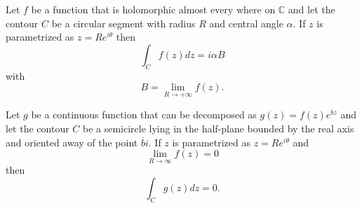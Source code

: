     \begin{theorem}\label{complexcalculus:theorem:great_limit}
        Let $f$ be a function that is holomorphic almost every where on $\mathbb{C}$ and let the contour $C$ be a circular segment with radius $R$ and central angle $\alpha$. If $z$ is parametrized as $z = Re^{i\theta}$ then\[\int_Cf(z)dz = i\alpha B\] with \[B = \lim_{R\rightarrow+\infty}f(z).\]
    \end{theorem}

    \begin{theorem}\label{complexcalculus:theorem:jordan}
        Let $g$ be a continuous function that can be decomposed as $g(z) = f(z)e^{bz}$ and let the contour $C$ be a semicircle lying in the half-plane bounded by the real axis and oriented away of the point $\overline{b}i$. If $z$ is parametrized as $z=Re^{i\theta}$ and \[\lim_{R\rightarrow\infty}f(z) = 0\] then \[\int_Cg(z)dz = 0.\]
    \end{theorem}
